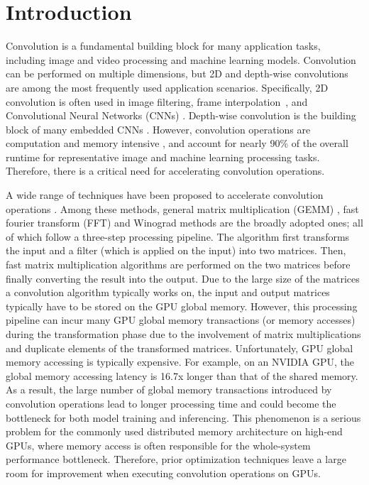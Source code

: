 \section{Introduction}
Convolution is a fundamental building block for many application tasks, including image and video processing and machine learning models.
Convolution can be performed on multiple dimensions, but  2D and depth-wise convolutions are among the most frequently used application
scenarios. Specifically, 2D convolution is often used in image filtering, frame
interpolation~\cite{Perrot2014Fine,Ma2014Optimized,Rudi2015Image,Niklaus2017Video}, and Convolutional Neural Networks (CNNs)
\cite{Krizhevsky2012ImageNet,SimonyanZ14a,HeZRS16,SzegedyLJSRAEVR15}. Depth-wise convolution is the building block of many embedded CNNs
\cite{Sandler_2018_CVPR,Ma_2018_ECCV,tan2019efficientnet}. However, convolution operations are computation and memory intensive
\cite{cavigelli2015accelerating}, and account for nearly 90\% of the overall runtime \cite{Li2016Performance} for representative image and
machine learning processing tasks. Therefore, there is a critical need for accelerating convolution operations.



A wide range of techniques have been proposed to accelerate convolution operations
\cite{Iandola2014Communication,vasilache2014fast,lavin2016fast,cho2017mec,Zhen2018Optimizing,Vasudevan2017Parallel,Chellapilla2006High,zhang2015dwarfcode}.
Among these methods, general matrix multiplication (GEMM) \cite{Vasudevan2017Parallel,Chellapilla2006High}, fast fourier transform (FFT)
\cite{vasilache2014fast} and Winograd \cite{lavin2016fast} methods are the broadly adopted ones;  all of which follow a three-step
processing pipeline. The algorithm first transforms the input and a filter (which is applied on the input) into two matrices. Then, fast
matrix multiplication algorithms \cite{karstadt2017matrix,scott2015matrix} are performed on the two matrices before finally converting the
result into the output. Due to the large size of the matrices a convolution algorithm typically works on, the input and output matrices
typically have to be stored on the GPU global memory. However, this processing pipeline can incur many GPU global memory transactions (or
memory accesses) during the transformation phase due to the involvement of matrix multiplications and duplicate elements of the transformed
matrices. Unfortunately, GPU global memory accessing is typically expensive. For example, on an NVIDIA GPU, the global memory accessing
latency is 16.7x longer than that of the shared memory. As a result, the large number of global memory transactions introduced by
convolution operations lead to longer processing time and could become the bottleneck for both model training and inferencing.  This
phenomenon is a serious problem for the commonly used distributed memory architecture on high-end GPUs, where memory access is often
responsible for the whole-system performance bottleneck. Therefore, prior optimization techniques leave a large room for improvement when
executing convolution operations on GPUs.



